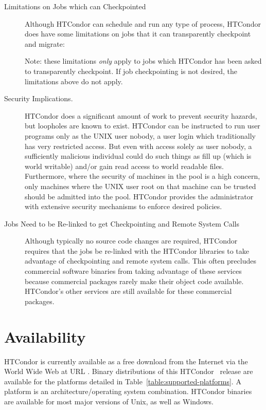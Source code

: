 \begin{description}

	\item[Limitations on Jobs which can Checkpointed] Although HTCondor can schedule and
run any type of process, HTCondor does have some limitations on jobs that it can
transparently checkpoint and migrate:



	Note: these limitations \emph{only} apply to jobs which HTCondor
has been asked to transparently checkpoint.  If job checkpointing is not
desired, the limitations above do not apply.

	\item[Security Implications.] HTCondor does a significant amount of
	work to prevent security hazards, but loopholes are known to exist.
	HTCondor can be instructed to run user programs only as the UNIX
	user nobody, a user login which traditionally has very 
	restricted access.
	But even with access solely as user nobody,
	a sufficiently malicious individual could do such things as fill up
	 (which is world writable) and/or gain read access to
	world readable files.
	Furthermore, where the security of machines in the pool is a
	high concern, 
	only machines where the UNIX user root on that machine can be
	trusted should be admitted into the pool.
	HTCondor provides the administrator with extensive security mechanisms 
	to enforce desired policies.

	\item[Jobs Need to be Re-linked to get Checkpointing and Remote System Calls] Although 
typically no source code changes are required,
HTCondor requires
that the jobs be re-linked with the HTCondor libraries to take
advantage of checkpointing and remote system calls. This often
precludes commercial software binaries from taking advantage of these services
because commercial packages rarely make their object code
available. 
HTCondor's other services are still available for these commercial packages.

\end{description}

\section{\label{sec:Availability}Availability}
HTCondor is currently available as a free download from the Internet via the World Wide Web at  
URL .
Binary distributions of this HTCondor \VersionNotice\ release
are available for the platforms 
detailed in Table~\ref{table:supported-platforms}.  A platform is an 
architecture/operating system combination.  
HTCondor binaries are available for most major versions of Unix, as well as
Windows.  

